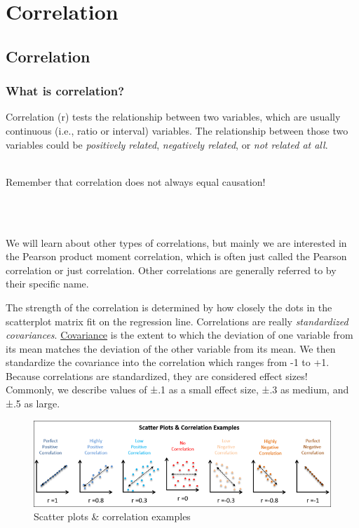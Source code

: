 \documentclass[
]{book}
\newenvironment{warning}
    {
    \hline\\
    }
    { 
    \\\\\hline
    }
\begin{document}
\hypertarget{part-correlation}{%
\part{Correlation}\label{part-correlation}}

\hypertarget{correlation}{%
\chapter{Correlation}\label{correlation}}

\hypertarget{what-is-correlation}{%
\section{What is correlation?}\label{what-is-correlation}}

Correlation (r) tests the relationship between two variables, which are usually continuous (i.e., ratio or interval) variables. The relationship between those two variables could be \emph{positively related}, \emph{negatively related}, or \emph{not related at all}.

\begin{warning}
Remember that correlation does not always equal causation!
\end{warning}

We will learn about other types of correlations, but mainly we are interested in the Pearson product moment correlation, which is often just called the Pearson correlation or just correlation. Other correlations are generally referred to by their specific name.

The strength of the correlation is determined by how closely the dots in the scatterplot matrix fit on the regression line. Correlations are really \emph{standardized covariances}. \underline{Covariance} is the extent to which the deviation of one variable from its mean matches the deviation of the other variable from its mean. We then standardize the covariance into the correlation which ranges from -1 to +1. Because correlations are standardized, they are considered effect sizes! Commonly, we describe values of ±.1 as a small effect size, ±.3 as medium, and ±.5 as large.

\begin{figure}

{\centering \includegraphics[width=1\linewidth]{images/08-correlation/correlation-examples} 

}

\caption{Scatter plots & correlation examples}\label{fig:unnamed-chunk-2}
\end{figure}
\end{document}
